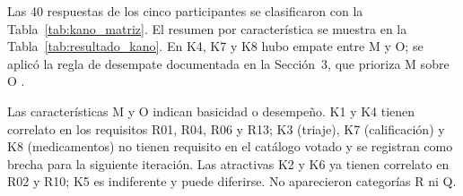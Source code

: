 ﻿Las 40 respuestas de los cinco participantes se clasificaron con la Tabla~\ref{tab:kano_matriz}. El resumen por característica se muestra en la Tabla~\ref{tab:resultado_kano}. En K4, K7 y K8 hubo empate entre M y O; se aplicó la regla de desempate documentada en la Sección~3, que prioriza M sobre O \cite{mkpojiogu2016}.

\begin{table}[htbp]
\centering
\footnotesize
\caption{Clasificación Kano resultante (5 participantes).}
\label{tab:resultado_kano}
\end{table}

Las características M y O indican basicidad o desempeño. K1 y K4 tienen correlato en los requisitos R01, R04, R06 y R13; K3 (triaje), K7 (calificación) y K8 (medicamentos) no tienen requisito en el catálogo votado y se registran como brecha para la siguiente iteración. Las atractivas K2 y K6 ya tienen correlato en R02 y R10; K5 es indiferente y puede diferirse. No aparecieron categorías R ni Q.



